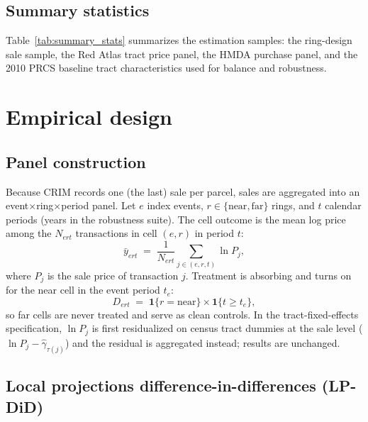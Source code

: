 \documentclass[11pt]{article}
\begin{document}
\subsection{Summary statistics}

Table~\ref{tab:summary_stats} summarizes the estimation samples: the
ring-design sale sample, the Red Atlas tract price panel, the HMDA purchase
panel, and the 2010 PRCS baseline tract characteristics used for balance
and robustness.



\section{Empirical design}

\subsection{Panel construction}

Because CRIM records one (the last) sale per parcel, sales are aggregated into
an event$\times$ring$\times$period panel. Let $e$ index events, $r \in
\{\text{near}, \text{far}\}$ rings, and $t$ calendar periods (years in the
robustness suite). The cell outcome is the mean log price among the
$N_{ert}$ transactions in cell $(e,r)$ in period $t$:
\begin{equation}
  \bar{y}_{ert} \;=\; \frac{1}{N_{ert}} \sum_{j \in (e,r,t)} \ln P_{j},
\end{equation}
where $P_j$ is the sale price of transaction $j$. Treatment is absorbing and
turns on for the near cell in the event period $t_e$:
\begin{equation}
  D_{ert} \;=\; \mathbf{1}\{r = \text{near}\}\times \mathbf{1}\{t \geq t_e\},
\end{equation}
so far cells are never treated and serve as clean controls. In the
tract-fixed-effects specification, $\ln P_j$ is first residualized on census
tract dummies at the sale level ($\ln P_j - \hat{\gamma}_{\tau(j)}$) and the
residual is aggregated instead; results are unchanged.

\subsection{Local projections difference-in-differences (LP-DiD)}
\end{document}
